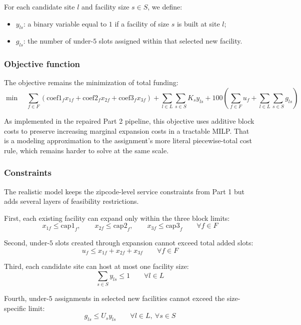 \documentclass[11pt]{article}
\newcommand{\1}{\mathbb{I}}
\begin{document}
\noindent
For each candidate site \(l\) and facility size \(s \in S\), we define:
\begin{itemize}
    \item \(y_{ls}\): a binary variable equal to \(1\) if a facility of size \(s\) is built at site \(l\);
    \item \(g_{ls}\): the number of under-\(5\) slots assigned within that selected new facility.
\end{itemize}

\subsubsection{Objective function}

The objective remains the minimization of total funding:
\[
\min \quad
\sum_{f \in F} \left(\mathrm{coef1}_f x_{1f} + \mathrm{coef2}_f x_{2f} + \mathrm{coef3}_f x_{3f}\right)
+
\sum_{l \in L} \sum_{s \in S} K_s y_{ls}
+
100\left(\sum_{f \in F} u_f + \sum_{l \in L} \sum_{s \in S} g_{ls}\right)
\]

As implemented in the repaired Part 2 pipeline, this objective uses additive block costs to preserve increasing marginal expansion costs in a tractable MILP. That is a modeling approximation to the assignment's more literal piecewise-total cost rule, which remains harder to solve at the same scale.

\subsubsection{Constraints}

The realistic model keeps the zipcode-level service constraints from Part 1 but adds several layers of feasibility restrictions.

First, each existing facility can expand only within the three block limits:
\[
x_{1f} \le \mathrm{cap1}_f,\qquad
x_{2f} \le \mathrm{cap2}_f,\qquad
x_{3f} \le \mathrm{cap3}_f
\qquad \forall f \in F
\]

Second, under-\(5\) slots created through expansion cannot exceed total added slots:
\[
u_f \le x_{1f} + x_{2f} + x_{3f}
\qquad \forall f \in F
\]

Third, each candidate site can host at most one facility size:
\[
\sum_{s \in S} y_{ls} \le 1
\qquad \forall l \in L
\]

Fourth, under-\(5\) assignments in selected new facilities cannot exceed the size-specific limit:
\[
g_{ls} \le U_s y_{ls}
\qquad \forall l \in L,\ \forall s \in S
\]
\end{document}
